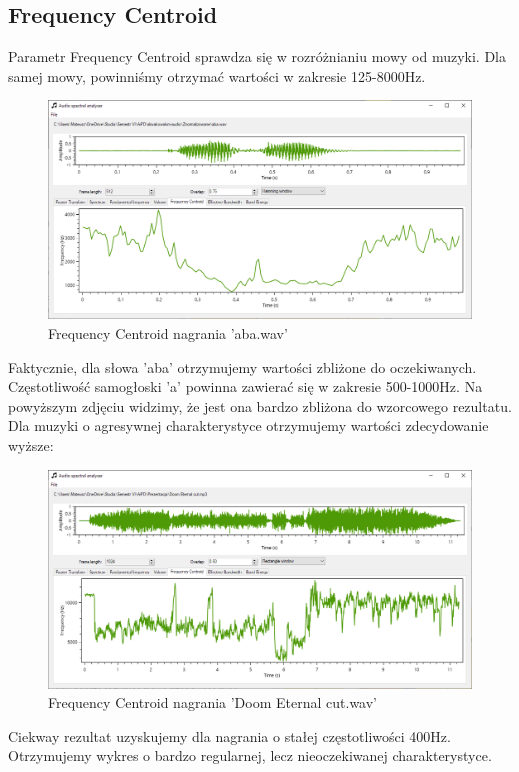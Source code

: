 \documentclass{article}
\begin{document}
\subsection{Frequency Centroid}
Parametr Frequency Centroid sprawdza się w rozróżnianiu mowy od muzyki. Dla samej mowy, powinniśmy otrzymać wartości w zakresie 125-8000Hz. 

\begin{figure}[H]
\includegraphics[width=6in]{scr4.png}
\centering
\caption{Frequency Centroid nagrania 'aba.wav'}
\end{figure}

\noindent Faktycznie, dla słowa 'aba' otrzymujemy wartości zbliżone do oczekiwanych. Częstotliwość samogłoski 'a' powinna zawierać się w zakresie 500-1000Hz. Na powyższym zdjęciu widzimy, że jest ona bardzo zbliżona do wzorcowego rezultatu. Dla muzyki o agresywnej charakterystyce otrzymujemy wartości zdecydowanie wyższe:

\begin{figure}[H]
\includegraphics[width=6in]{scr5.png}
\centering
\caption{Frequency Centroid nagrania 'Doom Eternal cut.wav'}
\end{figure}

\noindent Ciekway rezultat uzyskujemy dla nagrania o stałej częstotliwości 400Hz. Otrzymujemy wykres o bardzo regularnej, lecz nieoczekiwanej charakterystyce.
\end{document}
